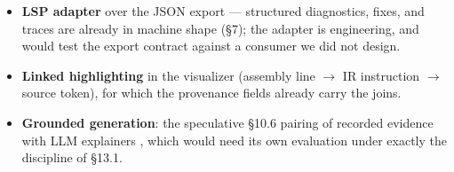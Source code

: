 \begin{itemize}
\item \textbf{LSP adapter} over the JSON export --- structured diagnostics, fixes, and traces are already in machine shape (\S7); the adapter is engineering, and would test the export contract against a consumer we did not design.
\item \textbf{Linked highlighting} in the visualizer (assembly line $\rightarrow$ IR instruction $\rightarrow$ source token), for which the provenance fields already carry the joins.
\item \textbf{Grounded generation}: the speculative \S10.6 pairing of recorded evidence with LLM explainers \cite{taylor2024dcc,santos2024silver}, which would need its own evaluation under exactly the discipline of \S13.1.
\end{itemize}




